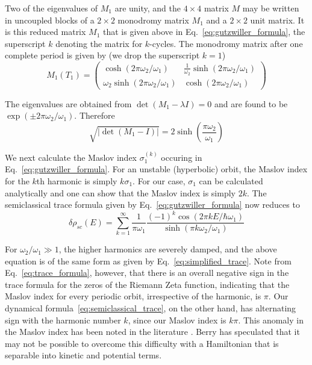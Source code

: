 \documentclass[11pt]{article}
\theoremstyle{plain}
\begin{document}
Two of the eigenvalues of $M_1$ are unity, and the $4 \times 4$ matrix $M$ may be written in uncoupled blocks of a $2 \times 2$ monodromy matrix $M_1$ and a $2 \times 2$ unit matrix. It is this reduced matrix $M_1$ that is given above in Eq.~\eqref{eq:gutzwiller_formula}, the superscript $k$ denoting the matrix for $k$-cycles. The monodromy matrix after one complete period is given by (we drop the superscript $k = 1$)
\begin{equation}
M_1(T_1) = \begin{pmatrix}
\cosh(2\pi\omega_2/\omega_1) & \frac{1}{\omega_2}\sinh(2\pi\omega_2/\omega_1) \\
\omega_2\sinh(2\pi\omega_2/\omega_1) & \cosh(2\pi\omega_2/\omega_1)
\end{pmatrix}
\label{eq:monodromy_matrix}
\end{equation}

The eigenvalues are obtained from $\det(M_1 - \lambda I) = 0$ and are found to be $\exp(\pm 2\pi\omega_2/\omega_1)$. Therefore
\begin{equation}
\sqrt{|\det(M_1 - I)|} = 2 \sinh\left(\frac{\pi\omega_2}{\omega_1}\right)
\label{eq:determinant}
\end{equation}

We next calculate the Maslov index $\sigma_1^{(k)}$ occuring in Eq.~\eqref{eq:gutzwiller_formula}. For an unstable (hyperbolic) orbit, the Maslov index for the $k$th harmonic is simply $k\sigma_1$. For our case, $\sigma_1$ can be calculated analytically and one can show that the Maslov index is simply $2k$. The semiclassical trace formula given by Eq.~\eqref{eq:gutzwiller_formula} now reduces to
\begin{equation}
\delta\rho_{sc}(E) = \sum_{k=1}^{\infty} \frac{1}{\pi\omega_1} \frac{(-1)^k \cos(2\pi kE/\hbar\omega_1)}{\sinh(\pi k\omega_2/\omega_1)}
\label{eq:semiclassical_trace}
\end{equation}

For $\omega_2/\omega_1 \gg 1$, the higher harmonics are severely damped, and the above equation is of the same form as given by Eq.~\eqref{eq:simplified_trace}. Note from Eq.~\eqref{eq:trace_formula}, however, that there is an overall negative sign in the trace formula for the zeros of the Riemann Zeta function, indicating that the Maslov index for every periodic orbit, irrespective of the harmonic, is $\pi$. Our dynamical formula~\eqref{eq:semiclassical_trace}, on the other hand, has alternating sign with the harmonic number $k$, since our Maslov index is $k\pi$. This anomaly in the Maslov index has been noted in the literature \cite{berry1990}. Berry has speculated that it may not be possible to overcome this difficulty with a Hamiltonian that is separable into kinetic and potential terms.
\end{document}
